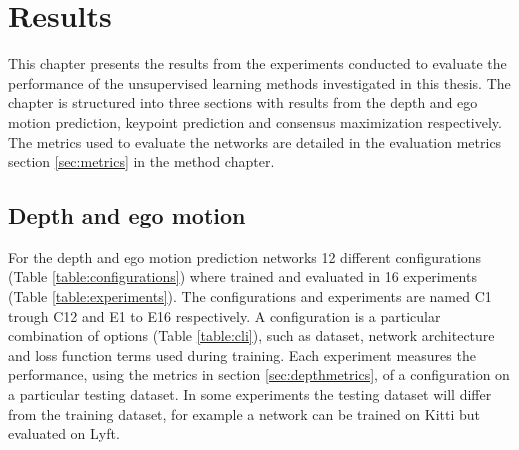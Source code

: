 \chapter{Results}\label{cha:results}

This chapter presents the results from the experiments conducted to evaluate the performance of the unsupervised learning methods investigated in this thesis. The chapter is structured into three sections with results from the depth and ego motion prediction, keypoint prediction and consensus maximization respectively. The metrics used to evaluate the networks are detailed in the evaluation metrics section \ref{sec:metrics} in the method chapter.

\section{Depth and ego motion}

For the depth and ego motion prediction networks 12 different configurations (Table \ref{table:configurations}) where trained and evaluated in 16 experiments (Table \ref{table:experiments}). The configurations and experiments are named C1 trough C12 and E1 to E16 respectively. A configuration is a particular combination of options (Table \ref{table:cli}), such as dataset, network architecture and loss function terms used during training. Each experiment measures the performance, using the metrics in section \ref{sec:depthmetrics}, of a configuration on a particular testing dataset. In some experiments the testing dataset will differ from the training dataset, for example a network can be trained on Kitti but evaluated on Lyft.

